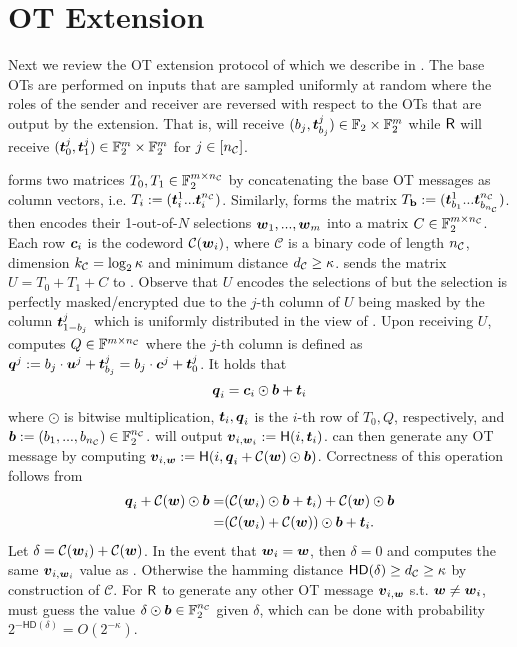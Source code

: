 


\section{OT Extension} \label{sec:otext}


Next we review the OT extension protocol of \cite{C:KelOrsSch15,RSA:OrrOrsSch17,JC:ALSZ17} which we describe in . The base OTs are performed on inputs that are sampled uniformly at random where the roles of the sender and receiver are reversed with respect to the OTs that are output by the extension. That is, \send will receive $(b_j, \tt^j_{b_j})\in\mathbb{F}_2\times \mathbb{F}_2^m$ while $\rec$ will receive $(\tt^j_0,\tt^j_1)\in\mathbb{F}_2^m\times \mathbb{F}_2^m$ for $j\in[\nc]$.

\rec forms two matrices $T_0,T_1\in \mathbb{F}_2^{m\times \nc}$ by concatenating the base OT messages as column vectors, i.e. $T_i:=(\tt^1_i ... \tt^\nc_i)$. Similarly, \send forms the matrix $T_{\text{\textbf{b}}}:=(\tt^1_{b_1}...\tt^\nc_{b_\nc})$. \rec then encodes their 1-out-of-$N$ selections $\ww_1,...,\ww_m$ into a matrix $C\in \mathbb{F}_2^{m\times \nc}$. Each row $\cc_i$ is the codeword $\mathcal{C}(\ww_i)$, where $\mathcal{C}$ is a binary code of length $\nc$, dimension $\kc=\log_2\kappa$ and minimum distance $\dc\geq\kappa$. \rec sends the matrix $U=T_0+T_1+C$
to \send. Observe that $U$ encodes the selections of \rec but the selection is perfectly masked/encrypted due to the $j$-th column of $U$ being masked by the column $\tt^j_{1-b_j}$ which is uniformly distributed in the view of \send. Upon receiving $U$, \send computes $Q\in\mathbb{F}^{m\times\nc}$ where the $j$-th column is defined as $\qq^j:=b_j\cdot \uu^j+\tt^j_{b_j}=b_j\cdot \cc^j+\tt^j_0$. It holds that 
$$
	\qq_i=\cc_i\odot \bb + \tt_i
$$
where $\odot$ is bitwise multiplication, $\tt_i,\qq_i$ is the $i$-th row of $T_0,Q$, respectively, and $\bb:=(b_1,...,b_\nc)\in \mathbb{F}^\nc_2$. \rec will output $\vv_{i,\ww_i}:=\H(i, \tt_i)$. \send can then generate any OT message by computing $\vv_{i,\ww}:=\H(i, \qq_i + \mathcal{C}(\ww)\odot \bb)$. Correctness of this operation follows from 
\begin{align*}
	\qq_i + \mathcal{C}(\ww)\odot \bb =&  (\mathcal{C}(\ww_i)\odot \bb + \tt_i) + \mathcal{C}(\ww)\odot \bb\\
	=& (\mathcal{C}(\ww_i) + \mathcal{C}(\ww)) \odot \bb +\tt_i.
\end{align*}
Let $\delta = \mathcal{C}(\ww_i) + \mathcal{C}(\ww)$. In the event that $\ww_i=\ww$, then $\delta=0$ and \send computes the same $\vv_{i,\ww_i}$ value as \rec. Otherwise the hamming distance $\textsf{HD}(\delta)\geq \dc\geq \kappa$ by construction of $\mathcal{C}$. For $\rec$ to generate any other OT message $\vv_{i,\ww}$ s.t. $\ww\neq \ww_i$, \rec must guess the value $\delta\odot \bb\in \mathbb{F}^\nc_2$ given $\delta$, which can be done with probability $2^{-\textsf{HD}(\delta)}=O(2^{-\kappa})$.

